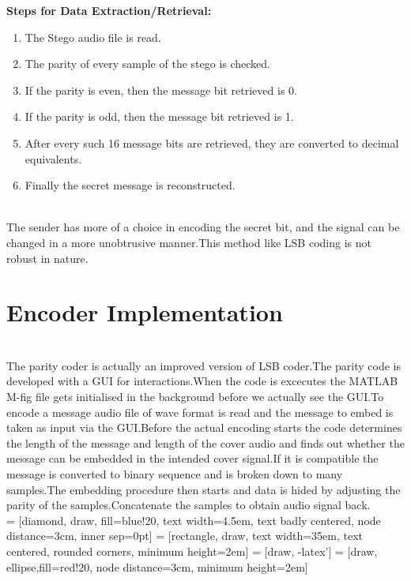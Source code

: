 \documentclass[a4paper, 12pt, notitlepage]{report}
\begin{document}
\begin{block}{\textbf{Steps for Data Extraction/Retrieval:}}
\begin{enumerate}
  \item {
    The Stego audio file is read.  
  }
	\item {
The parity of every sample of the stego is checked. 
  }
	\item {
    If the parity is even, then the message bit retrieved is 0.
  }
	\item {
    If the parity is odd, then the message bit retrieved is 1.}
	\item After every such 16 message bits are retrieved, they are converted to decimal equivalents.
	\item Finally the secret message is reconstructed.
  \end{enumerate}
\end{block}\\

 The  sender  has  more  of  a  choice  in  encoding  the secret  bit,  and  the  signal  can  be  changed  in  a  more  unobtrusive 
manner.This method like LSB coding is not robust in nature.\\

\section{Encoder Implementation}
\\
The parity coder is actually an improved version of LSB coder.The parity code is developed with a GUI for interactions.When the code is excecutes the MATLAB M-fig file gets initialised in the background before we actually see the GUI.To encode a message audio file of wave format is read and the message to embed is taken as input via the GUI.Before the actual encoding starts the code determines the length of the message and length of the cover audio and finds out whether the message can be embedded in the intended cover signal.If it is compatible the message is converted to binary sequence and is broken down to many samples.The embedding procedure then starts and data is hided by adjusting the parity of the samples.Concatenate the samples to obtain audio signal back.\\ 

 = [diamond, draw, fill=blue!20, 
    text width=4.5em, text badly centered, node distance=3cm, inner sep=0pt]
 = [rectangle, draw,
    text width=35em, text centered, rounded corners, minimum height=2em]
 = [draw, -latex']
 = [draw, ellipse,fill=red!20, node distance=3cm,
    minimum height=2em]
\end{document}
